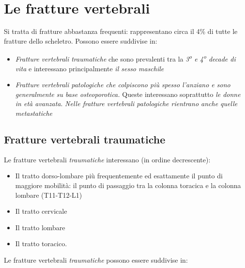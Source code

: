 \section{Le fratture vertebrali}

Si tratta di fratture abbastanza frequenti: rappresentano circa il 4\% di tutte le fratture dello scheletro. Possono essere suddivise in:

\begin{itemize}
\item
  \emph{Fratture vertebrali traumatiche} che sono prevalenti tra la \emph{3\textsuperscript{o} e 4\textsuperscript{o} decade di vita} e interessano principalmente \emph{il sesso maschile}
\item
  \emph{Fratture vertebrali patologiche che colpiscono più spesso l'anziano e sono generalmente su base osteoporotica.} Queste interessano soprattutto \emph{le donne in età avanzata}. \emph{Nelle fratture vertebrali patologiche rientrano anche quelle metastatiche}
\end{itemize}


\subsection{Fratture vertebrali traumatiche}

Le fratture vertebrali \emph{traumatiche} interessano (in ordine decrescente):

\begin{itemize}
\item
  Il tratto dorso-lombare più frequentemente ed esattamente il punto di maggiore mobilità: il punto di passaggio tra la colonna toracica e la colonna lombare (T11-T12-L1)
\item
  Il tratto cervicale
\item
  Il tratto lombare
\item
  Il tratto toracico.
\end{itemize}

Le fratture vertebrali \emph{traumatiche} possono essere suddivise in:

